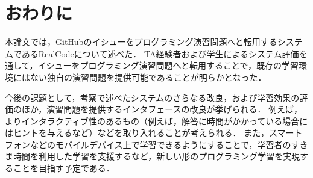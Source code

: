 \chapter{おわりに}
\graphicspath{{Chapter8/Figs/}}


本論文では，GitHubのイシューをプログラミング演習問題へと転用するシステムであるRealCodeについて述べた．
TA経験者および学生によるシステム評価を通して，イシューをプログラミング演習問題へと転用することで，既存の学習環境にはない独自の演習問題を提供可能であることが明らかとなった．

今後の課題として，考察で述べたシステムのさらなる改良，および学習効果の評価のほか，演習問題を提供するインタフェースの改良が挙げられる．
例えば，よりインタラクティブ性のあるもの（例えば，解答に時間がかかっている場合にはヒントを与えるなど）などを取り入れることが考えられる．
また，スマートフォンなどのモバイルデバイス上で学習できるようにすることで，学習者のすきま時間を利用した学習を支援するなど，新しい形のプログラミング学習を実現することを目指す予定である．
